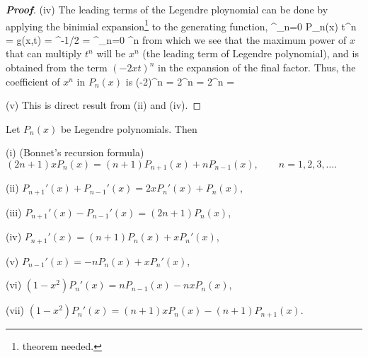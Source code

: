 \begin{proof}[\bf Proof]
\item [(iv)] The leading terms of the Legendre ploynomial can be done by applying the binimial expansion\footnote{theorem needed.} to the generating function,
\be
\sum^\infty_{n=0} P_n(x) t^n = g(x,t) = ^{-1/2} = \sum^\infty_{n=0} ^n
\ee
from which we see that the maximum power of $x$ that can multiply $t^n$ will be $x^n$ (the leading term of Legendre polynomial), and is obtained from the term $(-2xt)^n$ in the expansion of the final factor. Thus, the coefficient of $x^n$ in $P_n(x)$ is
\be
{} (-2)^n = 2^n   = 2^n   = 
\ee

\item [(v)] This is direct result from (ii) and (iv).
\een
\end{proof}


\begin{proposition}\label{pro:legendre_polynomials_recurrence_formulas}
Let $P_n(x)$ be Legendre polynomials. Then
\ben
\item [(i)] (Bonnet's recursion formula) $(2n+1) xP_n(x) = (n+1)P_{n+1}(x) + nP_{n-1}(x),\qquad n=1,2,3,\dots.$
\item [(ii)] $P_{n+1}'(x) + P_{n-1}'(x) = 2xP_{n}'(x) + P_n(x)$,
\item [(iii)] $P_{n+1}'(x) - P_{n-1}'(x) = (2n+1)P_n(x)$,
\item [(iv)] $P_{n+1}'(x) = (n+1)P_n(x) + xP_{n}'(x)$,
\item [(v)] $P_{n-1}'(x) = -n P_n(x) + xP_{n}'(x)$,
\item [(vi)] $(1-x^2)P_n'(x) = nP_{n-1}(x) - nxP_n(x)$,
\item [(vii)] $(1-x^2)P_n'(x) = (n+1)x P_{n}(x) - (n+1)P_{n+1}(x)$.
\een
\end{proposition}


